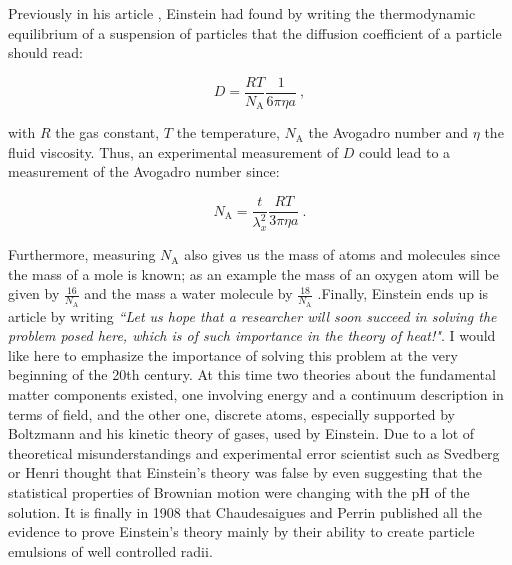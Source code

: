 Previously in his article \cite{einstein_uber_1905}, Einstein had found by writing the thermodynamic equilibrium of a suspension of particles that the diffusion coefficient of a particle should read:

\begin{equation}
	D = \frac{R T}{N_\mathrm{A}}\frac{1}{6\pi \eta a} ~,
	\label{Eq:D_einstein}
\end{equation}


with $R$ the gas constant, $T$ the temperature, $N_\mathrm{A}$ the Avogadro number and $\eta$ the fluid viscosity. Thus, an experimental measurement of $D$ could lead to a measurement of the Avogadro number since:

\begin{equation}
	N_\mathrm{A} = \frac{t}{\lambda_x^2} \frac{RT}{3\pi \eta a} ~.
\end{equation}

Furthermore, measuring $N_\mathrm{A}$ also gives us the mass of atoms and molecules since the mass of a mole is known; as an example the mass of an oxygen atom will be given by $\frac{16}{N_\mathrm{A}}$ and the mass a water molecule by $\frac{18}{N_\mathrm{A}}$ .Finally, Einstein ends up is article \cite{einstein_uber_1905} by writing \textit{``Let us hope that a researcher will soon succeed in solving the problem posed here, which is of such importance in the theory of heat!"}. I would like here to emphasize the importance of solving this problem at the very beginning of the 20th century. At this time two theories about the fundamental matter components existed, one involving energy and a continuum description in terms of field, and the other one, discrete atoms, especially supported by Boltzmann and his kinetic theory of gases, used by Einstein. Due to a lot of theoretical misunderstandings and experimental error scientist such as Svedberg or Henri thought that Einstein's theory was false \cite{genthon_concept_2020} by even suggesting that the statistical properties of Brownian motion were changing with the pH of the solution. It is finally in 1908 that Chaudesaigues and Perrin published all the evidence to prove Einstein's theory mainly by their ability to create particle emulsions of well controlled radii. 

